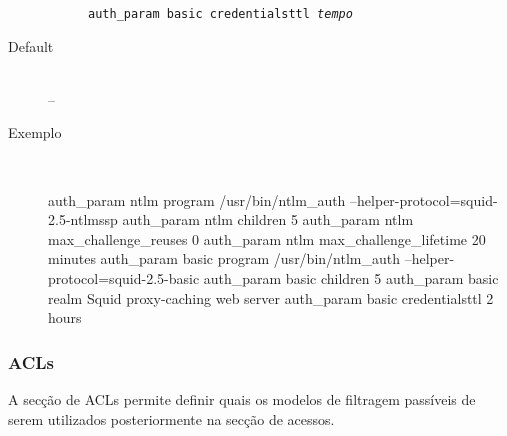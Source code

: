 \begin{description}
\begin{description}
\texttt{auth\_param basic credentialsttl \emph{tempo}}
\end{description}

\item[Default]~\\
--

\item[Exemplo]~\\
\begin{Output}
auth_param ntlm program /usr/bin/ntlm_auth --helper-protocol=squid-2.5-ntlmssp
auth_param ntlm children 5
auth_param ntlm max_challenge_reuses 0
auth_param ntlm max_challenge_lifetime 20 minutes
auth_param basic program /usr/bin/ntlm_auth --helper-protocol=squid-2.5-basic
auth_param basic children 5
auth_param basic realm Squid proxy-caching web server
auth_param basic credentialsttl 2 hours
\end{Output}
\end{description}

\subsubsection{ACLs}

A secção de ACLs permite definir quais os modelos de filtragem
passíveis de serem utilizados posteriormente na secção de
acessos.


